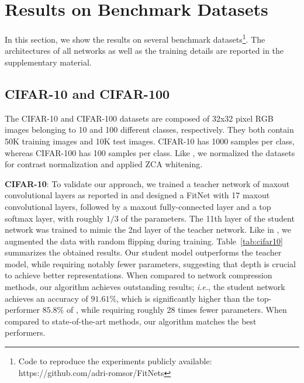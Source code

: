 \documentclass{article} %
\begin{document}
\vspace*{-1mm}
\section{Results on Benchmark Datasets}
\label{sec:exp}
\vspace*{-1mm}

In this section, we show the results on several benchmark datasets\footnote{Code to reproduce the experiments publicly available: https://github.com/adri-romsor/FitNets}. The architectures of all networks as well as the training details are reported in the supplementary material. 

\vspace*{-1mm}
\subsection{CIFAR-10 and CIFAR-100}
\vspace*{-1mm}

The CIFAR-10 and CIFAR-100 datasets \citep{Krizhevsky09} are composed of 32x32 pixel RGB images belonging to 10 and 100 different classes, respectively. They both contain 50K training images and 10K test images. CIFAR-10 has 1000 samples per class, whereas CIFAR-100 has 100 samples per class. 
Like \citet{Goodfellow13}, we normalized the datasets for contrast normalization and applied ZCA whitening.

\textbf{CIFAR-10}: To validate our approach, we trained a teacher network of maxout convolutional layers as reported in \citet{Goodfellow13} and designed a FitNet with
17 maxout convolutional layers, followed by a maxout fully-connected layer and a top softmax layer, with roughly $1/3$ of the
parameters. The 11th layer of the student network was trained to mimic the 2nd layer of the teacher network. 
Like in \citet{Goodfellow13,Lee14},  we augmented the data with random flipping during training. Table~\ref{tab:cifar10} summarizes the obtained results. Our student model
outperforms the teacher model, while requiring notably fewer parameters,
suggesting that depth is crucial to achieve better
representations. When compared to network compression methods, our algorithm
achieves outstanding results; \textit{i.e.}, the student network achieves an accuracy
of $91.61\%$, which is significantly higher than the top-performer $85.8\%$
of \cite{ba.2013}, while requiring roughly 28 times fewer
parameters. When compared to state-of-the-art methods, our
algorithm matches the best performers. 
\end{document}
